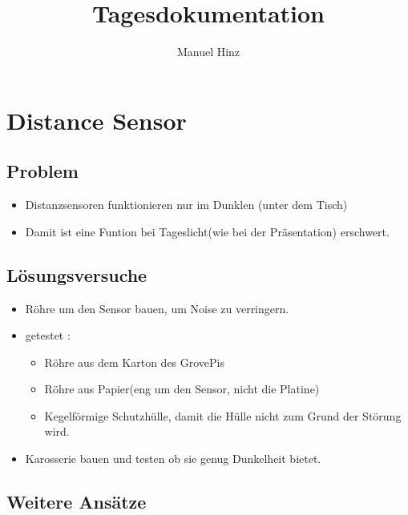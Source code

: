 \documentclass{article}
\author{Manuel Hinz}
\title{Tagesdokumentation}
\begin{document}
\maketitle

\section{Distance Sensor}

\subsection{Problem}

\begin{itemize}

\item Distanzsensoren funktionieren nur im Dunklen (unter dem Tisch)

\item Damit ist eine Funtion bei Tageslicht(wie bei der Pr\"{a}sentation) erschwert. 

\end{itemize}

\subsection{L\"{o}sungsversuche}

\begin{itemize}

\item R\"{o}hre um den Sensor bauen, um Noise zu verringern.

\item getestet :
\begin{itemize}

\item R\"{o}hre aus dem Karton des GrovePis

\item R\"{o}hre aus Papier(eng um den Sensor, nicht die Platine)

\item Kegelf\"{o}rmige Schutzh\"{u}lle, damit die H\"{u}lle nicht zum Grund der St\"{o}rung wird. 

\end{itemize} 

\item Karosserie bauen und testen ob sie genug Dunkelheit bietet.

\end{itemize}

\subsection{Weitere Ans\"{a}tze}
\end{document}
